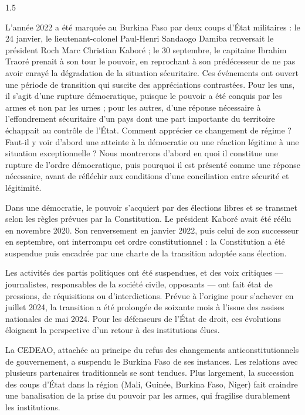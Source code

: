 \documentclass[12pt]{article}
\begin{document}
\begin{spacing}{1.5}


L'année 2022 a été marquée au Burkina Faso par deux coups d'État militaires : le 24 janvier, le lieutenant-colonel Paul-Henri Sandaogo Damiba renversait le président Roch Marc Christian Kaboré ; le 30 septembre, le capitaine Ibrahim Traoré prenait à son tour le pouvoir, en reprochant à son prédécesseur de ne pas avoir enrayé la dégradation de la situation sécuritaire. Ces événements ont ouvert une période de transition qui suscite des appréciations contrastées. Pour les uns, il s'agit d'une rupture démocratique, puisque le pouvoir a été conquis par les armes et non par les urnes ; pour les autres, d'une réponse nécessaire à l'effondrement sécuritaire d'un pays dont une part importante du territoire échappait au contrôle de l'État. Comment apprécier ce changement de régime ? Faut-il y voir d'abord une atteinte à la démocratie ou une réaction légitime à une situation exceptionnelle ? Nous montrerons d'abord en quoi il constitue une rupture de l'ordre démocratique, puis pourquoi il est présenté comme une réponse nécessaire, avant de réfléchir aux conditions d'une conciliation entre sécurité et légitimité.


Dans une démocratie, le pouvoir s'acquiert par des élections libres et se transmet selon les règles prévues par la Constitution. Le président Kaboré avait été réélu en novembre 2020. Son renversement en janvier 2022, puis celui de son successeur en septembre, ont interrompu cet ordre constitutionnel : la Constitution a été suspendue puis encadrée par une charte de la transition adoptée sans élection.

Les activités des partis politiques ont été suspendues, et des voix critiques — journalistes, responsables de la société civile, opposants — ont fait état de pressions, de réquisitions ou d'interdictions. Prévue à l'origine pour s'achever en juillet 2024, la transition a été prolongée de soixante mois à l'issue des assises nationales de mai 2024. Pour les défenseurs de l'État de droit, ces évolutions éloignent la perspective d'un retour à des institutions élues.

La CEDEAO, attachée au principe du refus des changements anticonstitutionnels de gouvernement, a suspendu le Burkina Faso de ses instances. Les relations avec plusieurs partenaires traditionnels se sont tendues. Plus largement, la succession des coups d'État dans la région (Mali, Guinée, Burkina Faso, Niger) fait craindre une banalisation de la prise du pouvoir par les armes, qui fragilise durablement les institutions.


\end{spacing}
\end{document}
